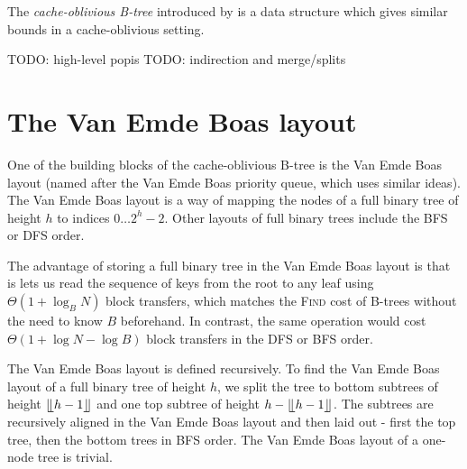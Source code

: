 The \textit{cache-oblivious B-tree} introduced by \cite{demaine00}
is a data structure which gives similar bounds in a cache-oblivious
setting.

TODO: high-level popis
TODO: indirection and merge/splits

\section{The Van Emde Boas layout}
One of the building blocks of the cache-oblivious B-tree is the Van Emde Boas
layout (named after the Van Emde Boas priority queue, which uses similar ideas).
The Van Emde Boas layout is a way of mapping the nodes of a full binary
tree of height $h$ to indices $0\ldots 2^h-2$. Other layouts of full binary
trees include the BFS or DFS order.

The advantage of storing a full binary tree in the Van Emde Boas layout
is that is lets us read the sequence of keys from the root to any leaf
using $\Theta(1+\log_B N)$ block transfers, which matches the \textsc{Find}
cost of B-trees without the need to know $B$ beforehand.
In contrast, the same operation would cost $\Theta(1+\log N-\log B)$ block
transfers in the DFS or BFS order.

The Van Emde Boas layout is defined recursively. To find the Van Emde Boas layout
of a full binary tree of height $h$, we split the tree to bottom subtrees
of height $\lfloor \kern -0.22em \lfloor h-1 \rfloor \kern -0.22em \rfloor$ and one top subtree of height $h - \lfloor \kern -0.22em \lfloor
h-1 \rfloor \kern -0.22em \rfloor$.
The subtrees are recursively aligned in the Van Emde Boas layout and then laid
out - first the top tree, then the bottom trees in BFS order. The Van Emde Boas
layout of a one-node tree is trivial.

